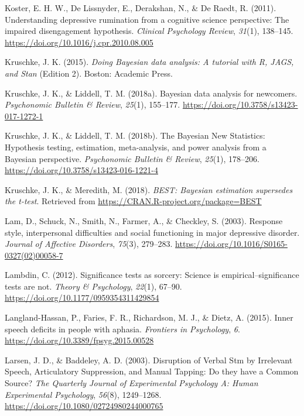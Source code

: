 \documentclass[a4paper,12pt,twoside,openright,oldfontcommands]{memoir}
\begin{document}
\leavevmode\hypertarget{ref-Koster2011}{}%
Koster, E. H. W., De Lissnyder, E., Derakshan, N., \& De Raedt, R. (2011). Understanding depressive rumination from a cognitive science perspective: The impaired disengagement hypothesis. \emph{Clinical Psychology Review}, \emph{31}(1), 138--145. \url{https://doi.org/10.1016/j.cpr.2010.08.005}

\leavevmode\hypertarget{ref-kruschke_doing_2015}{}%
Kruschke, J. K. (2015). \emph{Doing Bayesian data analysis: A tutorial with R, JAGS, and Stan} (Edition 2). Boston: Academic Press.

\leavevmode\hypertarget{ref-kruschke_bayesian_2018}{}%
Kruschke, J. K., \& Liddell, T. M. (2018a). Bayesian data analysis for newcomers. \emph{Psychonomic Bulletin \& Review}, \emph{25}(1), 155--177. \url{https://doi.org/10.3758/s13423-017-1272-1}

\leavevmode\hypertarget{ref-kruschke_bayesian_2018-1}{}%
Kruschke, J. K., \& Liddell, T. M. (2018b). The Bayesian New Statistics: Hypothesis testing, estimation, meta-analysis, and power analysis from a Bayesian perspective. \emph{Psychonomic Bulletin \& Review}, \emph{25}(1), 178--206. \url{https://doi.org/10.3758/s13423-016-1221-4}

\leavevmode\hypertarget{ref-R-BEST}{}%
Kruschke, J. K., \& Meredith, M. (2018). \emph{BEST: Bayesian estimation supersedes the t-test}. Retrieved from \url{https://CRAN.R-project.org/package=BEST}

\leavevmode\hypertarget{ref-lam_response_2003}{}%
Lam, D., Schuck, N., Smith, N., Farmer, A., \& Checkley, S. (2003). Response style, interpersonal difficulties and social functioning in major depressive disorder. \emph{Journal of Affective Disorders}, \emph{75}(3), 279--283. \url{https://doi.org/10.1016/S0165-0327(02)00058-7}

\leavevmode\hypertarget{ref-Lambdin2012}{}%
Lambdin, C. (2012). Significance tests as sorcery: Science is empirical--significance tests are not. \emph{Theory \& Psychology}, \emph{22}(1), 67--90. \url{https://doi.org/10.1177/0959354311429854}

\leavevmode\hypertarget{ref-langland-hassan_inner_2015}{}%
Langland-Hassan, P., Faries, F. R., Richardson, M. J., \& Dietz, A. (2015). Inner speech deficits in people with aphasia. \emph{Frontiers in Psychology}, \emph{6}. \url{https://doi.org/10.3389/fpsyg.2015.00528}

\leavevmode\hypertarget{ref-larsen_disruption_2003}{}%
Larsen, J. D., \& Baddeley, A. D. (2003). Disruption of Verbal Stm by Irrelevant Speech, Articulatory Suppression, and Manual Tapping: Do they have a Common Source? \emph{The Quarterly Journal of Experimental Psychology A: Human Experimental Psychology}, \emph{56}(8), 1249--1268. \url{https://doi.org/10.1080/02724980244000765}
\end{document}
